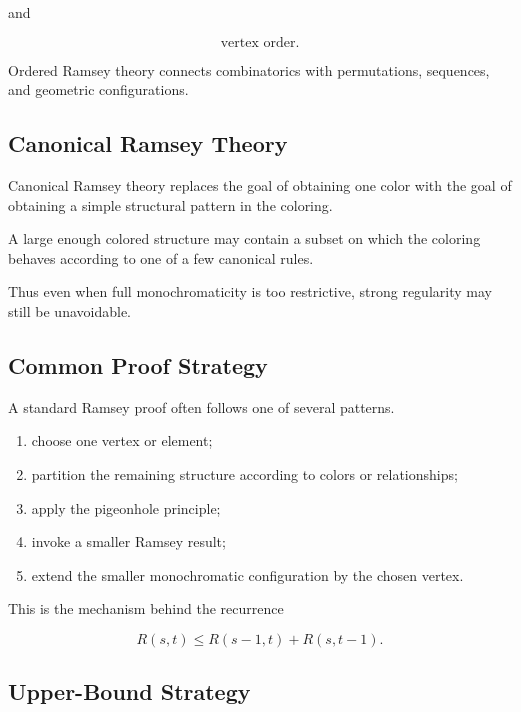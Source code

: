 and

\[
\text{vertex order}.
\]

Ordered Ramsey theory connects combinatorics with permutations,
sequences, and geometric configurations.

\subsection{Canonical Ramsey Theory}
\label{subsec:canonical-ramsey}

Canonical Ramsey theory replaces the goal of obtaining one color with
the goal of obtaining a simple structural pattern in the coloring.

A large enough colored structure may contain a subset on which the
coloring behaves according to one of a few canonical rules.

Thus even when full monochromaticity is too restrictive, strong
regularity may still be unavoidable.

\subsection{Common Proof Strategy}
\label{subsec:ramsey-proof-strategy}

A standard Ramsey proof often follows one of several patterns.

\begin{enumerate}
    \item choose one vertex or element;
    \item partition the remaining structure according to colors or
          relationships;
    \item apply the pigeonhole principle;
    \item invoke a smaller Ramsey result;
    \item extend the smaller monochromatic configuration by the chosen
          vertex.
\end{enumerate}

This is the mechanism behind the recurrence

\[
R(s,t)
\leq
R(s-1,t)+R(s,t-1).
\]

\subsection{Upper-Bound Strategy}
\label{subsec:ramsey-upper-bound-strategy}

